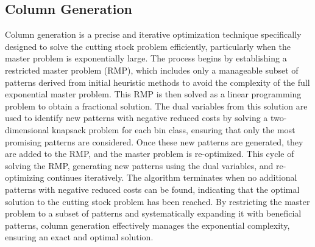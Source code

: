 \documentclass[a4paper]{article}
\begin{document}
\subsection{Column Generation}
Column generation is a precise and iterative optimization technique specifically designed to solve the cutting stock problem efficiently, particularly when the master problem is exponentially large. The process begins by establishing a restricted master problem (RMP), which includes only a manageable subset of patterns derived from initial heuristic methods to avoid the complexity of the full exponential master problem. This RMP is then solved as a linear programming problem to obtain a fractional solution. The dual variables from this solution are used to identify new patterns with negative reduced costs by solving a two-dimensional knapsack problem for each bin class, ensuring that only the most promising patterns are considered. Once these new patterns are generated, they are added to the RMP, and the master problem is re-optimized. This cycle of solving the RMP, generating new patterns using the dual variables, and re-optimizing continues iteratively. The algorithm terminates when no additional patterns with negative reduced costs can be found, indicating that the optimal solution to the cutting stock problem has been reached. By restricting the master problem to a subset of patterns and systematically expanding it with beneficial patterns, column generation effectively manages the exponential complexity, ensuring an exact and optimal solution.
\vspace{0.25cm}
\end{document}
